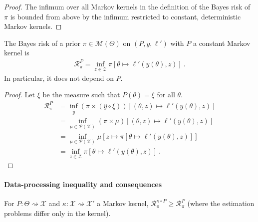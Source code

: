 \begin{proof}\mathlibok
\uses{}
The infimum over all Markov kernels in the definition of the Bayes risk of $\pi$ is bounded from above by the infimum restricted to constant, deterministic Markov kernels.
\end{proof}


\begin{lemma}
  \label{lem:bayesRisk_const}
  \mathlibok
  The Bayes risk of a prior $\pi \in \mathcal M(\Theta)$ on $(P, y, \ell')$ with $P$ a constant Markov kernel is
  \begin{align*}
  \mathcal R^P_\pi
  = \inf_{z \in \mathcal Z} \pi\left[\theta \mapsto \ell'(y(\theta), z)\right]
  \: .
  \end{align*}
  In particular, it does not depend on $P$.
\end{lemma}

\begin{proof}\mathlibok
\uses{}
Let $\xi$ be the measure such that $P(\theta) = \xi$ for all $\theta$.
\begin{align*}
\mathcal R^P_\pi
&= \inf_{\hat{y}}(\pi \times (\hat{y} \circ \xi))\left[(\theta, z)\mapsto \ell'(y(\theta), z)\right]
\\
&= \inf_{\mu \in \mathcal P(\mathcal X)} (\pi \times \mu)\left[(\theta, z)\mapsto \ell'(y(\theta), z)\right]
\\
&= \inf_{\mu \in \mathcal P(\mathcal X)} \mu\left[ z \mapsto \pi\left[\theta \mapsto \ell'(y(\theta), z)\right]\right]
\\
&= \inf_{z \in \mathcal Z} \pi\left[\theta \mapsto \ell'(y(\theta), z)\right]
\: .
\end{align*}

\end{proof}



\paragraph{Data-processing inequality and consequences}

\begin{theorem}
  \label{thm:data_proc_bayesRisk}
  \mathlibok
  For $P : \Theta \rightsquigarrow \mathcal X$ and $\kappa : \mathcal X \rightsquigarrow \mathcal X'$ a Markov kernel, $\mathcal R^{\kappa \circ P}_\pi \ge \mathcal R^{P}_\pi$ (where the estimation problems differ only in the kernel).
\end{theorem}


